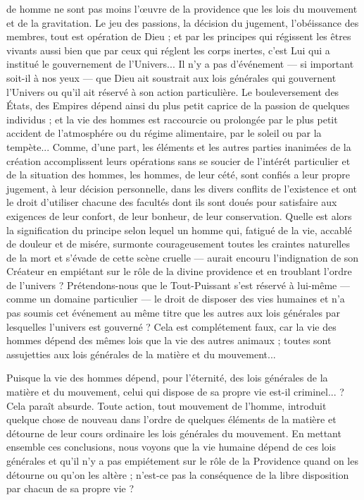 de homme ne sont pas moins l’{\oe}uvre de la providence
que les lois du mouvement et de la gravitation. Le jeu
des passions, la décision du jugement, l’obéissance des
membres, tout est opération de Dieu ; et par les principes
qui régissent les êtres vivants aussi bien que par ceux qui
réglent les corps inertes, c’est Lui qui a institué le gouvernement
de l’Univers... Il n’y a pas d’événement — si
important soit-il à nos yeux — que Dieu ait soustrait
aux lois générales qui gouvernent l’Univers ou qu'il ait
réservé à son action particulière. Le bouleversement des
États, des Empires dépend ainsi du plus petit caprice
de la passion de quelques individus ; et la vie des hommes
est raccourcie ou prolongée par le plus petit accident de
l'atmosphére ou du régime alimentaire, par le soleil ou
par la tempète... Comme, d’une part, les éléments et les
autres parties inanimées de la création accomplissent leurs
opérations sans se soucier de l'intérét particulier et de la
situation des hommes, les hommes, de leur cété, sont
confiés a leur propre jugement, à leur décision personnelle,
dans les divers conflits de l'existence et ont le droit d'utiliser
chacune des facultés dont ils sont doués pour satisfaire
aux exigences de leur confort, de leur bonheur,
de leur conservation. Quelle est alors la signification du
principe selon lequel un homme qui, fatigué de la vie,
accablé de douleur et de misére, surmonte courageusement
toutes les craintes naturelles de la mort et s'évade de cette
scène cruelle — aurait encouru l'indignation de son
Créateur en empiétant sur le rôle de la divine providence
et en troublant l'ordre de l'univers ? Prétendons-nous que
le Tout-Puissant s'est réservé à lui-même — comme un
domaine particulier — le droit de disposer des vies humaines
et n'a pas soumis cet événement au même titre que les
autres aux lois générales par lesquelles l'univers est
gouverné ? Cela est complétement faux, car la vie des
hommes dépend des mêmes lois que la vie des autres
animaux ; toutes sont assujetties aux lois générales de la
matière et du mouvement...

Puisque la vie des hommes dépend, pour l'éternité, des
lois générales de la matière et du mouvement, celui qui
dispose de sa propre vie est-il criminel... ? Cela paraît
absurde. Toute action, tout mouvement de l'homme,
introduit quelque chose de nouveau dans l’ordre de quelques
éléments de la matière et détourne de leur cours ordinaire
les lois générales du mouvement. En mettant ensemble
ces conclusions, nous voyons que la vie humaine dépend
de ces lois générales et qu’il n’y a pas empiétement sur
le rôle de la Providence quand on les détourne ou qu'on
les altère ; n’est-ce pas la conséquence de la libre disposition
par chacun de sa propre vie ?

